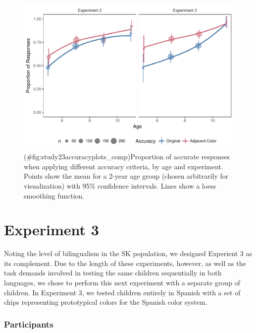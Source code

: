 \documentclass[
  english,
  ,man,floatsintext]{apa6}
\begin{document}
\begin{figure}
\centering
\includegraphics{amazon_color_files/figure-latex/study23accuracyplots_comp-1.pdf}
\caption{(\#fig:study23accuracyplots\_comp)Proportion of accurate responses when applying different accuracy criteria, by age and experiment. Points show the mean for a 2-year age group (chosen arbitrarily for visualization) with 95\% confidence intervals. Lines show a loess smoothing function.}
\end{figure}

\hypertarget{experiment-3}{%
\section{Experiment 3}\label{experiment-3}}

Noting the level of bilingualism in the SK population, we designed Experient 3 as its complement. Due to the length of these experiments, however, as well as the task demands involved in testing the same children sequentially in both languages, we chose to perform this next experiment with a separate group of children. In Experiment 3, we tested children entirely in Spanish with a set of chips representing prototypical colors for the Spanish color system.

\hypertarget{participants-2}{%
\subsubsection{Participants}\label{participants-2}}
\end{document}
